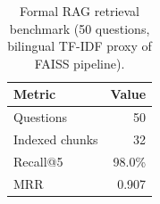 \begin{table}[htbp]
\centering
\caption{Formal RAG retrieval benchmark (50 questions, bilingual TF-IDF proxy of FAISS pipeline).}
\label{tab:rag-benchmark}
\small
\begin{tabular}{@{}lr@{}}
\toprule
\textbf{Metric} & \textbf{Value} \\
\midrule
Questions & 50 \\
Indexed chunks & 32 \\
Recall@5 & 98.0\% \\
MRR & 0.907 \\
\bottomrule
\end{tabular}
\end{table}
